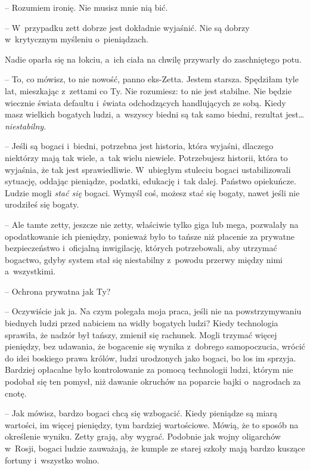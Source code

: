 \documentclass[oneside,polish,11pt,sfheadings]{mwbk}
\begin{document}
-- Rozumiem ironię. Nie musisz mnie nią bić.

-- W~przypadku zett dobrze jest dokładnie wyjaśnić. Nie są dobrzy w~krytycznym myśleniu o~pieniądzach.

Nadie oparła się na łokciu, a~ich ciała na chwilę przywarły do
zaschniętego potu. 

-- To, co mówisz, to nie nowość, panno eks-Zetta.
Jestem starsza. Spędziłam tyle lat, mieszkając z~zettami co Ty. Nie
rozumiesz: to nie jest stabilne. Nie będzie wiecznie świata defaultu i~świata odchodzących handlujących ze sobą. Kiedy masz wielkich bogatych
ludzi, a~wszyscy biedni są tak samo biedni, rezultat jest\ldots 
\textit{niestabilny}.

-- Jeśli są bogaci i~biedni, potrzebna jest historia, która wyjaśni,
dlaczego niektórzy mają tak wiele, a~tak wielu niewiele. Potrzebujesz
historii, która to wyjaśnia, że tak jest sprawiedliwie. W~ubiegłym
stuleciu bogaci ustabilizowali sytuację, oddając pieniądze, podatki,
edukację i~tak dalej. Państwo opiekuńcze. Ludzie mogli \textit{stać się}
bogaci. Wymyśl coś, możesz stać się bogaty, nawet jeśli nie urodziłeś
się bogaty.

-- Ale tamte zetty, jeszcze nie zetty, właściwie tylko giga lub mega,
pozwalały na opodatkowanie ich pieniędzy, ponieważ było to tańsze niż
płacenie za prywatne bezpieczeństwo i~oficjalną inwigilację, których
potrzebowali, aby utrzymać bogactwo, gdyby system stał się niestabilny z~powodu przerwy między nimi a~wszystkimi.

-- Ochrona prywatna jak Ty?

-- Oczywiście jak ja. Na czym polegała moja praca, jeśli nie na
powstrzymywaniu biednych ludzi przed nabiciem na widły bogatych ludzi?
Kiedy technologia sprawiła, że nadzór był tańszy, zmienił się rachunek.
Mogli trzymać więcej pieniędzy, bez udawania, że bogacenie się wynika z~dobrego samopoczucia, wrócić do idei boskiego prawa królów, ludzi
urodzonych jako bogaci, bo los im sprzyja. Bardziej opłacalne było
kontrolowanie za pomocą technologii ludzi, którym nie podobał się ten
pomysł, niż dawanie okruchów na poparcie bajki o~nagrodach za cnotę.

-- Jak mówisz, bardzo bogaci chcą się wzbogacić. Kiedy pieniądze są miarą
wartości, im więcej pieniędzy, tym bardziej wartościowe. Mówią, że to
sposób na określenie wyniku. Zetty grają, aby wygrać. Podobnie jak wojny
oligarchów w~Rosji, bogaci ludzie zauważają, że kumple ze starej szkoły
mają bardzo kuszące fortuny i~wszystko wolno.
\end{document}
